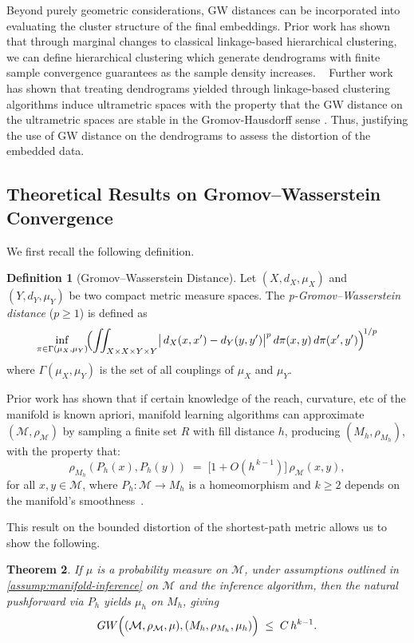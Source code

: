 \documentclass{article}
\theoremstyle{plain}
\newtheorem{theorem}{Theorem}[section]
\theoremstyle{definition}
\newtheorem{definition}[theorem]{Definition}
\theoremstyle{remark}
\begin{document}
Beyond purely geometric considerations, GW distances can be incorporated into evaluating the cluster structure of the final embeddings. Prior work has shown that through marginal changes to classical linkage-based hierarchical clustering, we can define hierarchical clustering which generate dendrograms with finite sample convergence guarantees as the sample density increases. ~\citet{chaudhuriConsistentProceduresCluster2014} Further work has shown that treating dendrograms yielded through linkage-based clustering algorithms induce ultrametric spaces with the property that the GW distance on the ultrametric spaces are stable in the Gromov-Hausdorff sense \cite{carlssonCharacterizationStabilityConvergence}. Thus, justifying the use of GW distance on the dendrograms to assess the distortion of the embedded data.


\subsection{Theoretical Results on Gromov--Wasserstein Convergence}
\label{sec:theory-GW-convergence}

We first recall the following definition.
\begin{definition}[Gromov--Wasserstein Distance]\label{def:GW-Dist}
Let $(X,d_X,\mu_X)$ and $(Y,d_Y,\mu_Y)$ be two compact metric measure spaces. The \emph{p-Gromov--Wasserstein distance} ($p\ge1$) is defined as
$$
\inf_{\pi \in \Gamma(\mu_X,\mu_Y)} \!\Bigl(\iint_{X\times X\times Y\times Y}
\bigl|\,d_X(x,x') - d_Y(y,y')\bigr|^p
\,d\pi(x,y)\,d\pi(x',y')\Bigr)^{\!1/p}
$$
where $\Gamma(\mu_X,\mu_Y)$ is the set of all couplings of $\mu_X$ and $\mu_Y$.
\end{definition}

Prior work has shown that if certain knowledge of the reach, curvature, etc of the manifold is known apriori, manifold learning algorithms can approximate $(\mathcal{M},\rho_{\mathcal{M}})$ by sampling a finite set $R$ with fill distance $h$, producing $(M_h, \rho_{M_h})$, with the property that:
$$
\rho_{M_h}(P_h(x), P_h(y)) \;=\; \bigl[1 + O(h^{\,k-1})\bigr] \,\rho_{\mathcal{M}}(x,y),
$$
for all $x,y\in \mathcal{M}$, where $P_h:\mathcal{M}\to M_h$ is a homeomorphism and $k\ge2$ depends on the manifold’s smoothness~\citet{soberApproximatingRiemannianMetric2020}. 

This result on the bounded distortion of the shortest-path metric allows us to show the following.
\begin{theorem}
If $\mu$ is a probability measure on $\mathcal{M}$, under assumptions outlined in \ref{assump:manifold-inference} on $\mathcal{M}$ and the inference algorithm, then the natural pushforward via $P_h$ yields $\mu_h$ on $M_h$, giving
$$
GW\Bigl((\mathcal{M},\rho_{\mathcal{M}},\mu), (M_h,\rho_{M_h},\mu_h)\Bigr) 
\;\le\; C\,h^{k-1}.
$$
\end{theorem}
\end{document}
